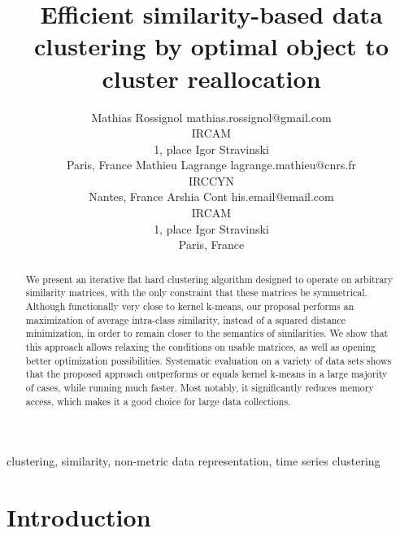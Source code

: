 \documentclass[twoside,11pt]{article}
\begin{document}
\title{Efficient similarity-based data clustering by optimal object to cluster reallocation}

\author{
\name Mathias Rossignol \email mathias.rossignol@gmail.com\\
\addr IRCAM\\
1, place Igor Stravinski\\
Paris, France
\AND
\name Mathieu Lagrange \email lagrange.mathieu@cnrs.fr\\
\addr IRCCYN\\
Nantes, France
\AND
\name Arshia Cont \email his.email@email.com\\
\addr IRCAM\\
1, place Igor Stravinski\\
Paris, France}

\editor{}

\maketitle


\begin{abstract}%
We present an iterative flat hard clustering algorithm designed to operate on arbitrary similarity matrices, with the only constraint that these matrices be symmetrical. Although functionally very close to kernel k-means, our proposal performs an maximization of average intra-class similarity, instead of a squared distance minimization, in order to remain closer to the semantics of similarities. We show that this approach allows relaxing the conditions on usable matrices, as well as opening better optimization possibilities. Systematic evaluation on a variety of data sets shows that the proposed approach outperforms or equals kernel k-means in a large majority of cases, while running much faster. Most notably, it significantly reduces memory access, which makes it a good choice for large data collections.
\end{abstract}

\begin{keywords}
clustering, similarity, non-metric data representation, time series clustering
\end{keywords}


\section{Introduction}
\end{document}
